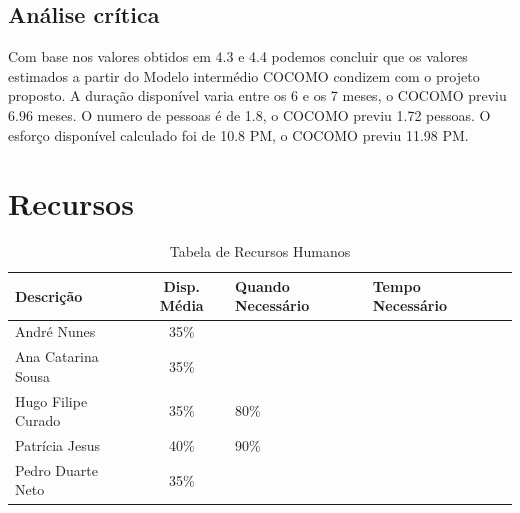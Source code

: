 \documentclass[a4paper]{report}
\begin{document}
\subsection{Análise crítica}
\label{AC}
Com base nos valores obtidos em 4.3 e 4.4 podemos concluir que os valores estimados a partir do Modelo intermédio COCOMO condizem com o projeto proposto.
A duração disponível varia entre os 6 e os 7 meses, o COCOMO previu 6.96 meses.
O numero de pessoas é de 1.8, o COCOMO previu 1.72 pessoas.
O esforço disponível calculado foi de 10.8 PM, o COCOMO previu 11.98 PM.
\section{Recursos}
\begin{table}[h]
\centering
\begin{tabularx}{\textwidth}{X|c|X|X|c}
\textbf{Descrição} & \textbf{Disp. Média} & \textbf{Quando Necessário} & \textbf{Tempo Necessário} \\ \hline
André Nunes & 35\% &   &  \\ \hline
Ana Catarina Sousa & 35\% &  &  \\ \hline
Hugo Filipe Curado & 35\% & 80\% & \\ \hline
Patrícia Jesus & 40\% & 90\% &  \\ \hline
Pedro Duarte Neto & 35\% &  &  \\
\end{tabularx}
\caption{Tabela de Recursos Humanos}
\label{TabRH}
\end{table}
\end{document}
